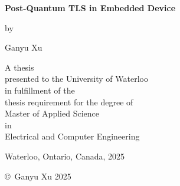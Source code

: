 \documentclass[letterpaper,12pt,titlepage,oneside,final]{book}
\begin{document}
\pagestyle{empty}

\begin{titlepage}
        \begin{center}
        \vspace*{1.0cm}

        \Huge
        {\bf Post-Quantum TLS in Embedded Device}

        \vspace*{1.0cm}

        \normalsize
        by \\

        \vspace*{1.0cm}

        \Large
        Ganyu Xu \\

        \vspace*{3.0cm}

        \normalsize
        A thesis \\
        presented to the University of Waterloo \\ 
        in fulfillment of the \\
        thesis requirement for the degree of \\
        Master of Applied Science \\
        in \\
        Electrical and Computer Engineering\\

        \vspace*{2.0cm}

        Waterloo, Ontario, Canada, 2025 \\

        \vspace*{1.0cm}

        \copyright\ Ganyu Xu 2025 \\
        \end{center}
\end{titlepage}
\end{document}
